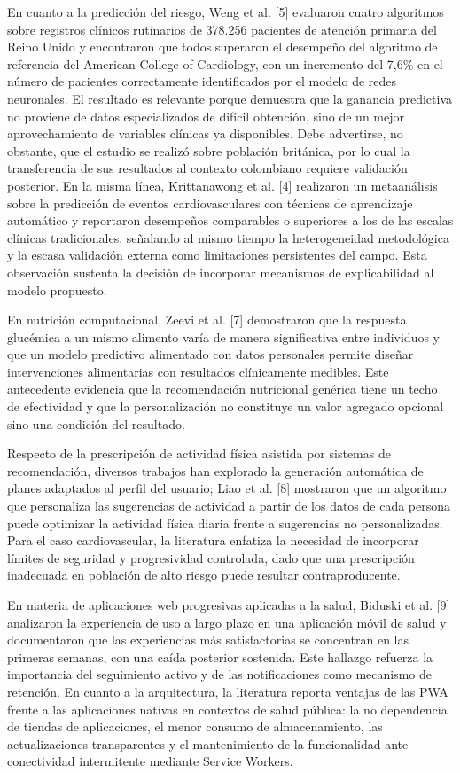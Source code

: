 \documentclass[conference]{IEEEtran}
\begin{document}
En cuanto a la predicción del riesgo, Weng et al. [5] evaluaron cuatro algoritmos sobre registros clínicos rutinarios de 378.256 pacientes de atención primaria del Reino Unido y encontraron que todos superaron el desempeño del algoritmo de referencia del American College of Cardiology, con un incremento del 7{,}6\% en el número de pacientes correctamente identificados por el modelo de redes neuronales. El resultado es relevante porque demuestra que la ganancia predictiva no proviene de datos especializados de difícil obtención, sino de un mejor aprovechamiento de variables clínicas ya disponibles. Debe advertirse, no obstante, que el estudio se realizó sobre población británica, por lo cual la transferencia de sus resultados al contexto colombiano requiere validación posterior. En la misma línea, Krittanawong et al. [4] realizaron un metaanálisis sobre la predicción de eventos cardiovasculares con técnicas de aprendizaje automático y reportaron desempeños comparables o superiores a los de las escalas clínicas tradicionales, señalando al mismo tiempo la heterogeneidad metodológica y la escasa validación externa como limitaciones persistentes del campo. Esta observación sustenta la decisión de incorporar mecanismos de explicabilidad al modelo propuesto.

En nutrición computacional, Zeevi et al. [7] demostraron que la respuesta glucémica a un mismo alimento varía de manera significativa entre individuos y que un modelo predictivo alimentado con datos personales permite diseñar intervenciones alimentarias con resultados clínicamente medibles. Este antecedente evidencia que la recomendación nutricional genérica tiene un techo de efectividad y que la personalización no constituye un valor agregado opcional sino una condición del resultado.

Respecto de la prescripción de actividad física asistida por sistemas de recomendación, diversos trabajos han explorado la generación automática de planes adaptados al perfil del usuario; Liao et al. [8] mostraron que un algoritmo que personaliza las sugerencias de actividad a partir de los datos de cada persona puede optimizar la actividad física diaria frente a sugerencias no personalizadas. Para el caso cardiovascular, la literatura enfatiza la necesidad de incorporar límites de seguridad y progresividad controlada, dado que una prescripción inadecuada en población de alto riesgo puede resultar contraproducente.

En materia de aplicaciones web progresivas aplicadas a la salud, Biduski et al. [9] analizaron la experiencia de uso a largo plazo en una aplicación móvil de salud y documentaron que las experiencias más satisfactorias se concentran en las primeras semanas, con una caída posterior sostenida. Este hallazgo refuerza la importancia del seguimiento activo y de las notificaciones como mecanismo de retención. En cuanto a la arquitectura, la literatura reporta ventajas de las PWA frente a las aplicaciones nativas en contextos de salud pública: la no dependencia de tiendas de aplicaciones, el menor consumo de almacenamiento, las actualizaciones transparentes y el mantenimiento de la funcionalidad ante conectividad intermitente mediante Service Workers.
\end{document}
